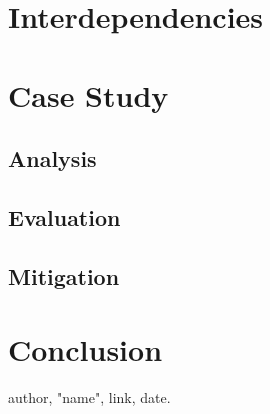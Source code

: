 \documentclass[11pt,a4paper,draft]{article}
\begin{document}
\section{Interdependencies}

\section{Case Study}

\subsection{Analysis}

\subsection{Evaluation}

\subsection{Mitigation}

\section{Conclusion}

\cite{item}

\begin{thebibliography}{9}

author,
"name",
link,
date.

\end{thebibliography}
\end{document}
